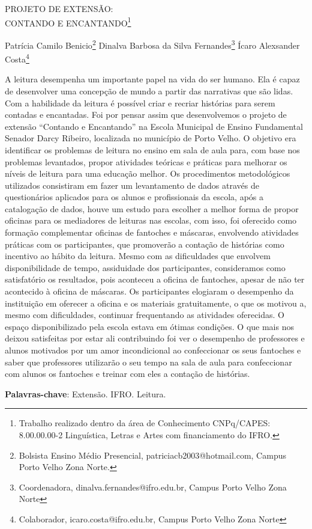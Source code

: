 \documentclass[article,12pt,onesidea,4paper,english,brazil]{abntex2}
\begin{document}
	
	
	\frenchspacing 
	
	\begin{center}
		\LARGE PROJETO DE EXTENSÃO: \\CONTANDO E ENCANTANDO\footnote{Trabalho realizado dentro da área de Conhecimento CNPq/CAPES: 8.00.00.00-2 Linguística, Letras e Artes com financiamento do IFRO.}
		
		\normalsize
		Patrícia Camilo Benicio\footnote{Bolsista Ensino Médio Presencial, patriciacb2003@hotmail.com, Campus Porto Velho Zona Norte.} 
		Dinalva Barbosa da Silva Fernandes\footnote{Coordenadora, dinalva.fernandes@ifro.edu.br, Campus Porto Velho Zona Norte} 
		Ícaro Alexsander Costa\footnote{Colaborador,  icaro.costa@ifro.edu.br, Campus Porto Velho Zona Norte}
	\end{center}
	
	\noindent A leitura desempenha um importante papel na vida do ser humano. Ela é capaz de desenvolver uma concepção de mundo a partir das narrativas que são lidas. Com a habilidade da leitura é possível criar e recriar histórias para serem contadas e encantadas. Foi por pensar assim que desenvolvemos o projeto de extensão “Contando e Encantando” na Escola Municipal de Ensino Fundamental Senador Darcy Ribeiro, localizada no município de Porto Velho. O objetivo era identificar os problemas de leitura no ensino em sala de aula para, com base nos problemas levantados, propor atividades teóricas e práticas para melhorar os níveis de leitura para uma educação melhor. Os procedimentos metodológicos utilizados consistiram em fazer um levantamento de dados através de questionários aplicados para os alunos e profissionais da escola, após a catalogação de dados, houve um estudo para escolher a melhor forma de propor oficinas para os mediadores de leituras nas escolas, com isso, foi oferecido como formação complementar oficinas de fantoches e máscaras, envolvendo atividades práticas com os participantes, que promoverão a contação de histórias como incentivo ao hábito da leitura. Mesmo com as dificuldades que envolvem disponibilidade de tempo, assiduidade dos participantes, consideramos como satisfatório os resultados, pois aconteceu a oficina de fantoches, apesar de não ter acontecido à oficina de máscaras. Os participantes elogiaram o desempenho da instituição em oferecer a oficina e os materiais gratuitamente, o que os motivou a, mesmo com dificuldades, continuar frequentando as atividades oferecidas. O espaço disponibilizado pela escola estava em ótimas condições. O que mais nos deixou satisfeitas por estar ali contribuindo foi ver o desempenho de professores e alunos motivados por um amor incondicional ao confeccionar os seus fantoches e saber que professores utilizarão o seu tempo na sala de aula para confeccionar com alunos os fantoches e treinar com eles a contação de histórias.
	
	\vspace{\onelineskip}
	
	\noindent
	\textbf{Palavras-chave}: Extensão. IFRO. Leitura.
	
\end{document}
